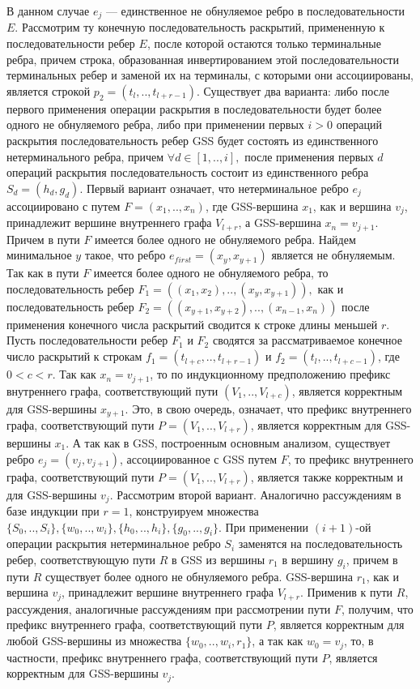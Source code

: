 В данном случае $e_{j}$ --- единственное не обнуляемое ребро в последовательности $E$. Рассмотрим ту конечную последовательность раскрытий, примененную к последовательности ребер $E$, после которой остаются только терминальные ребра, причем строка, образованная инвертированием этой последовательности терминальных ребер и заменой их на терминалы, с которыми они ассоциированы, является строкой $p_{2} = (t_{l},..,t_{l+r-1})$. Существует два варианта: либо после первого применения операции раскрытия в последовательности будет более одного не обнуляемого ребра, либо при применении первых $i > 0$ операций раскрытия последовательность ребер GSS будет состоять из единственного нетерминального ребра, причем $\forall d \in [1,..,i],$ после применения первых $d$ операций раскрытия последовательность состоит из единственного ребра $S_{d} = (h_{d}, g_{d})$. Первый вариант означает, что нетерминальное ребро $e_{j}$ ассоциировано с путем $F = (x_{1},..,x_{n})$, где GSS-вершина $x_{1}$, как и вершина $v_{j}$, принадлежит вершине внутреннего графа $V_{l+r}$, а GSS-вершина $x_{n} = v_{j+1}$. Причем в пути $F$ имеется более одного не обнуляемого ребра. Найдем минимальное $y$ такое, что ребро $e_{first} = (x_{y}, x_{y+1})$ является не обнуляемым. Так как в пути $F$ имеется более одного не обнуляемого ребра, то последовательность ребер $F_{1} = ((x_{1},x_{2}),..,(x_{y},x_{y+1})),$ как и последовательность ребер $F_{2} = ((x_{y+1},x_{y+2}),..,(x_{n-1},x_{n}))$ после применения конечного числа раскрытий сводится к строке длины меньшей $r$. Пусть последовательности ребер $F_{1}$ и $F_{2}$ сводятся за рассматриваемое конечное число раскрытий к строкам $f_{1} = (t_{l+c},..,t_{l+r-1})$ и $f_{2} = (t_{l},..,t_{l+c-1})$, где $0 < c < r$. Так как $x_{n} = v_{j+1}$, то по индукционному предположению префикс внутреннего графа, соответствующий пути $(V_{1},..,V_{l+c})$, является корректным для GSS-вершины $x_{y+1}$. Это, в свою очередь, означает, что префикс внутреннего графа, соответствующий пути $P = (V_{1},..,V_{l+r})$, является корректным для GSS-вершины $x_{1}$. А так как в GSS, построенным основным анализом, существует ребро $e_{j} = (v_{j}, v_{j+1})$, ассоциированное с GSS путем $F$, то префикс внутреннего графа, соответствующий пути $P = (V_{1},..,V_{l+r})$, является также корректным и для GSS-вершины $v_{j}$. Рассмотрим второй вариант. Аналогично рассуждениям в базе индукции при $r = 1$, конструируем множества $\{S_{0},..,S_{i}\},\{w_{0},..,w_{i}\}, \{h_{0},..,h_{i}\}, \{g_{0},..,g_{i}\}$. При применении $(i+1)$-ой операции раскрытия нетерминальное ребро $S_{i}$ заменятся на последовательность ребер, соответствующую пути $R$ в GSS из вершины $r_{1}$ в вершину $g_{i}$, причем в пути $R$ существует более одного не обнуляемого ребра. GSS-вершина $r_{1}$, как и вершина $v_{j}$, принадлежит вершине внутреннего графа $V_{l+r}$. Применив к пути $R$, рассуждения, аналогичные рассуждениям при рассмотрении пути $F$, получим, что префикс внутреннего графа, соответствующий пути $P$, является корректным для любой GSS-вершины из множества $\{w_{0},..,w_{i},r_{1}\}$, а так как $w_{0} = v_{j}$, то, в частности, префикс внутреннего графа, соответствующий пути $P$, является корректным для GSS-вершины $v_{j}$.


